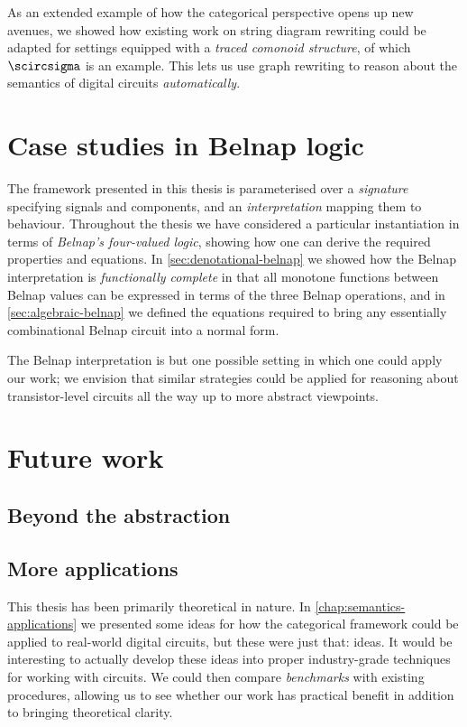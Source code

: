 As an extended example of how the categorical perspective opens up new avenues,
we showed how existing work on string diagram rewriting could be adapted for
settings equipped with a \emph{traced comonoid structure}, of which
\(\scircsigma\) is an example.
This lets us use graph rewriting to reason about the semantics of digital
circuits \emph{automatically}.

\section{Case studies in Belnap logic}

The framework presented in this thesis is parameterised over a
\emph{signature} specifying signals and components, and an
\emph{interpretation} mapping them to behaviour.
Throughout the thesis we have considered a particular instantiation in terms of
\emph{Belnap's four-valued logic}, showing how one can derive the required
properties and equations.
In \cref{sec:denotational-belnap} we showed how the Belnap interpretation is
\emph{functionally complete} in that all monotone functions between Belnap
values can be expressed in terms of the three Belnap operations, and in
\cref{sec:algebraic-belnap} we defined the equations required to bring any
essentially combinational Belnap circuit into a normal form.

The Belnap interpretation is but one possible setting in which one could apply
our work; we envision that similar strategies could be applied for reasoning
about transistor-level circuits all the way up to more abstract viewpoints.

\section{Future work}

\subsection{Beyond the abstraction}



\subsection{More applications}

This thesis has been primarily theoretical in nature.
In \cref{chap:semantics-applications} we presented some ideas for how
the categorical framework could be applied to real-world digital circuits, but
these were just that: ideas.
It would be interesting to actually develop these ideas into proper
industry-grade techniques for working with circuits.
We could then compare \emph{benchmarks} with existing procedures, allowing us to
see whether our work has practical benefit in addition to bringing theoretical
clarity.

